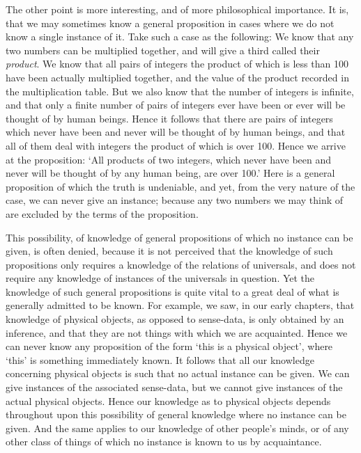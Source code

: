 \documentclass[oneside,letterpaper,12pt]{book}
\begin{document}
The other point is more interesting, and of more philosophical
importance. \label{single} It is, that we may sometimes know a general proposition in
cases where we do not know a single instance of it. Take such a case as
the following: We know that any two numbers can be multiplied together,
and will give a third called their \emph{product}. We know that all
pairs of integers the product of which is less than 100 have been
actually multiplied together, and the value of the product recorded in
the multiplication table. But we also know that the number of integers
is infinite, and that only a finite number of pairs of integers ever
have been or ever will be thought of by human beings. Hence it follows
that there are pairs of integers which never have been and never will be
thought of by human beings, and that all of them deal with integers the
product of which is over 100. Hence we arrive at the proposition:
`All products of two integers, which never have been and
never will be thought of by any human being, are over
100.' Here is a general proposition of which the truth
is undeniable, and yet, from the very nature of the case, we can never
give an instance; because any two numbers we may think of are excluded
by the terms of the proposition.

This possibility, of knowledge of general propositions of which no
instance can be given, is often denied, because it is not perceived that
the knowledge of such propositions only requires a knowledge of the
relations of universals, and does not require any knowledge of instances
of the universals in question. Yet the knowledge of such general
propositions is quite vital to a great deal of what is generally
admitted to be known. For example, we saw, in our early chapters, that
knowledge of physical objects, as opposed to sense-data, is only
obtained by an inference, and that they are not things with which we are
acquainted. Hence we can never know any proposition of the form
`this is a physical object', where
`this' is something immediately known.
It follows that all our knowledge concerning physical objects is such
that no actual instance can be given. We can give instances of the
associated sense-data, but we cannot give instances of the actual
physical objects. Hence our knowledge as to physical objects depends
throughout upon this possibility of general knowledge where no instance
can be given. And the same applies to our knowledge of other
people's minds, or of any other class of things of which
no instance is known to us by acquaintance.
\end{document}
